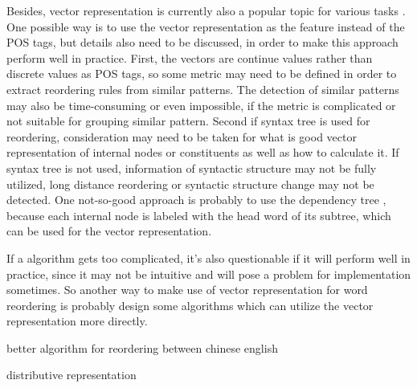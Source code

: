 Besides, vector representation is currently also a popular topic for various tasks \citep{oxford, Mikolov}. One possible way is to use the vector representation as the feature instead of the POS tags, but details also need to be discussed, in order to make this approach perform well in practice. First, the vectors are continue values rather than discrete values as POS tags, so some metric may need to be defined in order to extract reordering rules from similar patterns. The detection of similar patterns may also be time-consuming or even impossible, if the metric is complicated or not suitable for grouping similar pattern. Second if syntax tree is used for reordering, consideration may need to be taken for what is good vector representation of internal nodes or constituents as well as how to calculate it. If syntax tree is not used, information of syntactic structure may not be fully utilized, long distance reordering or syntactic structure change may not be detected. One not-so-good approach is probably to use the dependency tree \citep{depend}, because each internal node is labeled with the head word of its subtree, which can be used for the vector representation. 

If a algorithm gets too complicated, it's also questionable if it will perform well in practice, since it may not be intuitive and will pose a problem for implementation sometimes. So another way to make use of vector representation for word reordering is probably design some algorithms which can utilize the vector representation more directly.



better algorithm for reordering between chinese english

distributive representation